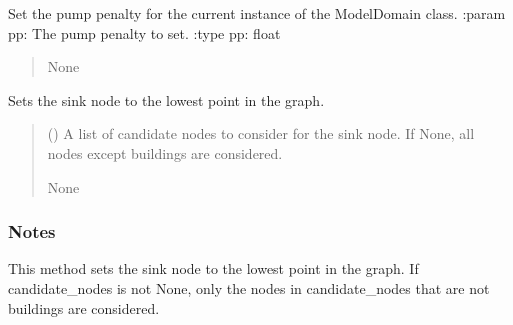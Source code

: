 \documentclass[letterpaper,10pt,english]{sphinxmanual}
\begin{document}
\begin{fulllineitems}
\begin{fulllineitems}
\end{fulllineitems}


\begin{fulllineitems}
\label{\detokenize{pysewer:pysewer.preprocessing.ModelDomain.set_pump_penalty}}
\pysigstartsignatures
{}
\pysigstopsignatures
\sphinxAtStartPar
Set the pump penalty for the current instance of the ModelDomain class.
:param pp: The pump penalty to set.
:type pp: float
\begin{quote}\begin{description}
\sphinxAtStartPar
None

\end{description}\end{quote}

\end{fulllineitems}


\begin{fulllineitems}
\label{\detokenize{pysewer:pysewer.preprocessing.ModelDomain.set_sink_lowest}}
\pysigstartsignatures
{}
\pysigstopsignatures
\sphinxAtStartPar
Sets the sink node to the lowest point in the graph.
\begin{quote}\begin{description}
\sphinxAtStartPar
{} (\sphinxstyleliteralemphasis{\sphinxupquote{, }}) \textendash{} A list of candidate nodes to consider for the sink node. If None, all nodes except buildings are considered.

\sphinxAtStartPar
None

\end{description}\end{quote}
\subsubsection*{Notes}

\sphinxAtStartPar
This method sets the sink node to the lowest point in the graph. If candidate\_nodes is not None, only the nodes in candidate\_nodes that are not buildings are considered.

\end{fulllineitems}


\end{fulllineitems}
\end{document}
